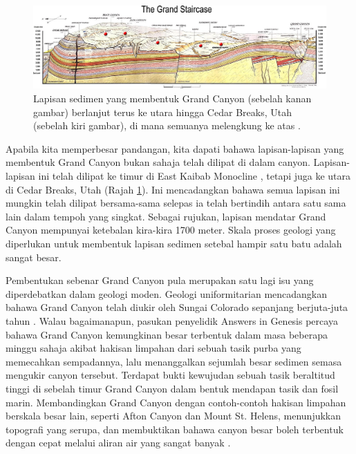 \documentclass[10pt,twocolumn,letterpaper]{article}
\begin{document}
\begin{figure}
\begin{center}
\includegraphics[width=1\textwidth]{Grand_Staircase-big.jpg}
\end{center}
   \caption{Lapisan sedimen yang membentuk Grand Canyon (sebelah kanan gambar) berlanjut terus ke utara hingga Cedar Breaks, Utah (sebelah kiri gambar), di mana semuanya melengkung ke atas \cite{50}.}
\label{fig:4}
\end{figure}

Apabila kita memperbesar pandangan, kita dapati bahawa lapisan-lapisan yang membentuk Grand Canyon bukan sahaja telah dilipat di dalam canyon. Lapisan-lapisan ini telah dilipat ke timur di East Kaibab Monocline \cite{46}, tetapi juga ke utara di Cedar Breaks, Utah (Rajah \ref{fig:4}). Ini mencadangkan bahawa semua lapisan ini mungkin telah dilipat bersama-sama selepas ia telah bertindih antara satu sama lain dalam tempoh yang singkat. Sebagai rujukan, lapisan mendatar Grand Canyon mempunyai ketebalan kira-kira 1700 meter. Skala proses geologi yang diperlukan untuk membentuk lapisan sedimen setebal hampir satu batu adalah sangat besar.

Pembentukan sebenar Grand Canyon pula merupakan satu lagi isu yang diperdebatkan dalam geologi moden. Geologi uniformitarian mencadangkan bahawa Grand Canyon telah diukir oleh Sungai Colorado sepanjang berjuta-juta tahun \cite{47}. Walau bagaimanapun, pasukan penyelidik Answers in Genesis percaya bahawa Grand Canyon kemungkinan besar terbentuk dalam masa beberapa minggu sahaja akibat hakisan limpahan dari sebuah tasik purba yang memecahkan sempadannya, lalu menanggalkan sejumlah besar sedimen semasa mengukir canyon tersebut. Terdapat bukti kewujudan sebuah tasik beraltitud tinggi di sebelah timur Grand Canyon dalam bentuk mendapan tasik dan fosil marin. Membandingkan Grand Canyon dengan contoh-contoh hakisan limpahan berskala besar lain, seperti Afton Canyon dan Mount St. Helens, menunjukkan topografi yang serupa, dan membuktikan bahawa canyon besar boleh terbentuk dengan cepat melalui aliran air yang sangat banyak \cite{48}.
\end{document}
